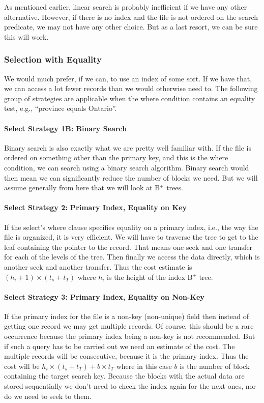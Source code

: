 As mentioned earlier, linear search is probably inefficient if we have any other alternative. However, if there is no index and the file is not ordered on the search predicate, we may not have any other choice. But as a last resort, we can be sure this will work.

\subsubsection*{Selection with Equality}

We would much prefer, if we can, to use an index of some sort. If we have that, we can access a lot fewer records than we would otherwise need to. The following group of strategies are applicable when the where condition contains an equality test, e.g., ``province equals Ontario''.

\paragraph{Select Strategy 1B: Binary Search}
Binary search is also exactly what we are pretty well familiar with. If the file is ordered on something other than the primary key, and this is the where condition, we can search using a binary search algorithm. Binary search would then mean we can significantly reduce the number of blocks we need. But we will assume generally from here that we will look at B$^{+}$ trees.

\paragraph{Select Strategy 2: Primary Index, Equality on Key}
If the select's where clause specifies equality on a primary index, i.e., the way the file is organized, it is very efficient. We will have to traverse the tree to get to the leaf containing the pointer to the record. That means one seek and one transfer for each of the levels of the tree. Then finally we access the data directly, which is another seek and another transfer. Thus the cost estimate is $(h_{i} + 1) \times (t_{s} + t_{T})$ where $h_{i}$ is the height of the index B$^{+}$ tree.

\paragraph{Select Strategy 3: Primary Index, Equality on Non-Key}
If the primary index for the file is a non-key (non-unique) field then instead of getting one record we may get multiple records. Of course, this should be a rare occurrence because the primary index being a non-key is not recommended. But if such a query has to be carried out we need an estimate of the cost. The multiple records will be consecutive, because it is the primary index. Thus the cost will be $h_{i} \times (t_{s} + t_{T}) + b \times t_{T}$ where in this case $b$ is the number of block containing the target search key. Because the blocks with the actual data are stored sequentially we don't need to check the index again for the next ones, nor do we need to seek to them.


